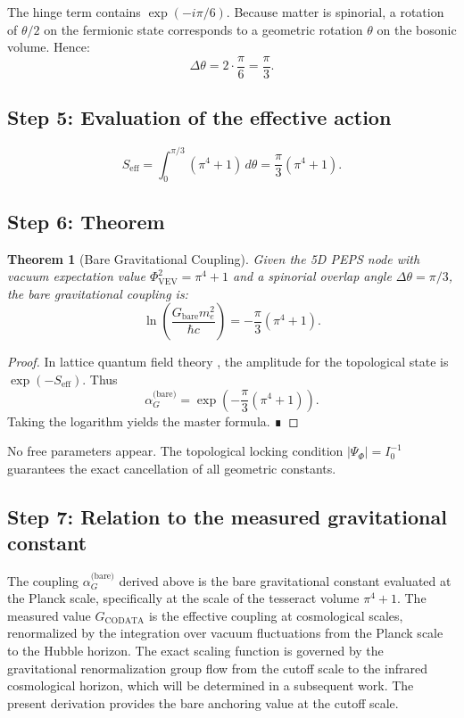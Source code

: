 \documentclass[12pt]{article}
\newtheorem{theorem}{Theorem}[section]
\begin{document}
The hinge term contains \(\exp(-i\pi/6)\). Because matter is spinorial, a rotation of \(\theta/2\) on the fermionic state corresponds to a geometric rotation \(\theta\) on the bosonic volume. Hence:
\[
\Delta\theta = 2 \cdot \frac{\pi}{6} = \frac{\pi}{3}.
\]

\subsection{Step 5: Evaluation of the effective action}

\[
S_{\text{eff}} = \int_{0}^{\pi/3} (\pi^4 + 1) \, d\theta = \frac{\pi}{3} (\pi^4 + 1).
\]

\subsection{Step 6: Theorem}

\begin{theorem}[Bare Gravitational Coupling]
Given the 5D PEPS node with vacuum expectation value \(\Phi_{\text{VEV}}^2 = \pi^4 + 1\) and a spinorial overlap angle \(\Delta\theta = \pi/3\), the bare gravitational coupling is:
\[
\ln\left(\frac{G_{\text{bare}} m_e^2}{\hbar c}\right) = -\frac{\pi}{3}\left(\pi^4 + 1\right).
\]
\end{theorem}

\begin{proof}
In lattice quantum field theory \cite{Creutz1983}, the amplitude for the topological state is \(\exp(-S_{\text{eff}})\). Thus
\[
\alpha_G^{\text{(bare)}} = \exp\!\left( -\frac{\pi}{3} (\pi^4 + 1) \right).
\]
Taking the logarithm yields the master formula. ∎
\end{proof}

No free parameters appear. The topological locking condition \(|\Psi_\Phi| = I_0^{-1}\) guarantees the exact cancellation of all geometric constants.

\subsection{Step 7: Relation to the measured gravitational constant}

The coupling \(\alpha_G^{\text{(bare)}}\) derived above is the bare gravitational constant evaluated at the Planck scale, specifically at the scale of the tesseract volume \(\pi^4 + 1\). The measured value \(G_{\text{CODATA}}\) is the effective coupling at cosmological scales, renormalized by the integration over vacuum fluctuations from the Planck scale to the Hubble horizon. The exact scaling function is governed by the gravitational renormalization group flow from the cutoff scale to the infrared cosmological horizon, which will be determined in a subsequent work. The present derivation provides the bare anchoring value at the cutoff scale.
\end{document}
